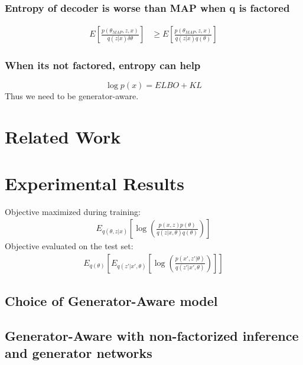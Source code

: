 \documentclass{article}
\begin{document}
\subsubsection{Entropy of decoder is worse than MAP when q is factored}

\begin{align}
    E\left[ \frac{p(\theta_{MAP},z,x)}{q(z|x) \delta \theta} \right] & \geq E\left[ \frac{p(\theta_{MAP},z,x)}{q(z|x) q(\theta)} \right] 
\end{align}


\subsubsection{When its not factored, entropy can help}

$$\log p(x) = ELBO + KL$$
Thus we need to be generator-aware.





\section{Related Work}





\section{Experimental Results}


Objective maximized during training:
\begin{align}
 E_{q(\theta,z|x)} \left[\log \left( \frac{p(x,z)p(\theta)}{q(z|x,\theta)q(\theta)} \right) \right ] 
\end{align}
Objective evaluated on the test set:
\begin{align}
 E_{q(\theta)} \left[ E_{q(z'|x',\theta)} \left[\log \left( \frac{p(x',z'|\theta)}{q(z'|x',\theta)} \right) \right ] \right ] 
\end{align}

\subsection{Choice of Generator-Aware model}

\subsection{Generator-Aware with non-factorized inference and generator networks}
\end{document}
